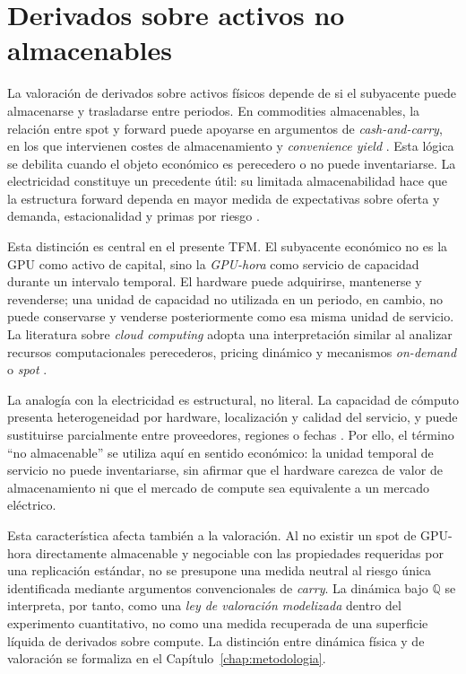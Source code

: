 \section{Derivados sobre activos no almacenables}
\label{sec:nonstorable_assets}

La valoración de derivados sobre activos físicos depende de si el subyacente puede
almacenarse y trasladarse entre periodos. En commodities almacenables, la relación
entre spot y forward puede apoyarse en argumentos de \textit{cash-and-carry}, en los
que intervienen costes de almacenamiento y \textit{convenience yield}
\cite{schwartz_1997}. Esta lógica se debilita cuando el objeto económico es
perecedero o no puede inventariarse. La electricidad constituye un precedente
útil: su limitada almacenabilidad hace que la estructura forward dependa en mayor
medida de expectativas sobre oferta y demanda, estacionalidad y primas por riesgo
\cite{lucia_schwartz_2002}.

Esta distinción es central en el presente TFM. El subyacente económico no es la
GPU como activo de capital, sino la \emph{GPU-hora} como servicio de capacidad
durante un intervalo temporal. El hardware puede adquirirse, mantenerse y
revenderse; una unidad de capacidad no utilizada en un periodo, en cambio, no puede
conservarse y venderse posteriormente como esa misma unidad de servicio. La
literatura sobre \textit{cloud computing} adopta una interpretación similar al
analizar recursos computacionales perecederos, pricing dinámico y mecanismos
\textit{on-demand} o \textit{spot}
\cite{xu2013dynamiccloud,li2016spotpricing,wu2019cloudpricing}.

La analogía con la electricidad es estructural, no literal. La capacidad de cómputo
presenta heterogeneidad por hardware, localización y calidad del servicio, y puede
sustituirse parcialmente entre proveedores, regiones o fechas
\cite{li2016spotpricing}. Por ello, el término ``no almacenable'' se utiliza aquí en
sentido económico: la unidad temporal de servicio no puede inventariarse, sin
afirmar que el hardware carezca de valor de almacenamiento ni que el mercado de
compute sea equivalente a un mercado eléctrico.

Esta característica afecta también a la valoración. Al no existir un spot de
GPU-hora directamente almacenable y negociable con las propiedades requeridas por
una replicación estándar, no se presupone una medida neutral al riesgo única
identificada mediante argumentos convencionales de \textit{carry}. La dinámica bajo
$\mathbb{Q}$ se interpreta, por tanto, como una \emph{ley de valoración modelizada}
dentro del experimento cuantitativo, no como una medida recuperada de una superficie
líquida de derivados sobre compute. La distinción entre dinámica física y de
valoración se formaliza en el Capítulo~\ref{chap:metodologia}.

